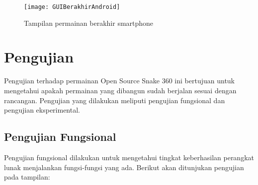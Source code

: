 \begin{figure}[H]
	\centering  
	\texttt{[image: GUIBerakhirAndroid]}  
	\caption[Tampilan permainan berakhir pada smartphone]{Tampilan permainan berakhir smartphone}
	\label{fig:GUIBerakhirAndroid} 
\end{figure}

\section{Pengujian}
Pengujian terhadap permainan Open Source Snake 360 ini bertujuan untuk mengetahui apakah permainan yang dibangun sudah berjalan sesuai dengan rancangan. Pengujian yang dilakukan meliputi pengujian fungsional dan pengujian eksperimental. 

\subsection{Pengujian Fungsional}
Pengujian fungsional dilakukan untuk mengetahui tingkat keberhasilan perangkat lunak menjalankan fungsi-fungsi yang ada. Berikut akan ditunjukan pengujian pada tampilan: 

